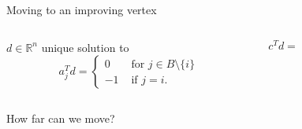 \begin{frame}{ }

  \begin{columns}
    \begin{column}{.5\textwidth}
      
    \end{column}
    \begin{column}{.5\textwidth}
      
    \end{column}       
  \end{columns}
\end{frame}



\begin{frame}{Moving to an improving vertex}
  


  \begin{columns}
    \begin{column}{.5\textwidth}
      $d ∈ ℝ^n$ unique solution to 
  \begin{displaymath}
  a_j^T d =
  \begin{cases}
    0 & \text{ for } j \in B \setminus \{i\} \\
    -1 & \text{ if } j =i.
  \end{cases}
\end{displaymath}
    \end{column}
    \begin{column}{.5\textwidth}
        $c^T d = $ 
    \end{column}       
  \end{columns}
\end{frame}


\begin{frame}{How far can we move?}

  \begin{columns}
    \begin{column}{.5\textwidth}
      
    \end{column}
    \begin{column}{.5\textwidth}
      
    \end{column}       
  \end{columns}
\end{frame}




